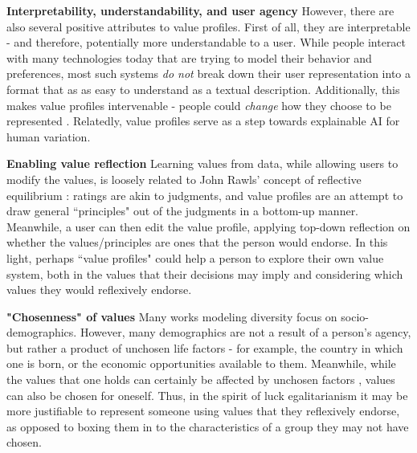 \documentclass[11pt]{article}
\begin{document}
\textbf{Interpretability, understandability, and user agency}
However, there are also several positive attributes to value profiles. First of all, they are interpretable - and therefore, potentially more understandable to a user. While people interact with many technologies today that are trying to model their behavior and preferences, most such systems \textit{do not} break down their user representation into a format that as as easy to understand as a textual description.
Additionally, this makes value profiles intervenable - people could \textit{change} how they choose to be represented \cite{Radlinski2019,lazar2024moralcaseusinglanguage}.
Relatedly, value profiles serve as a step towards explainable AI \citep{arrieta2019explainableartificialintelligencexai, koh2020conceptbottleneckmodels} for human variation.

\textbf{Enabling value reflection}
Learning values from data, while allowing users to modify the values, is loosely related to John Rawls' concept of reflective equilibrium \citep{rawls2005political, sep-reflective-equilibrium}: ratings are akin to judgments, and value profiles are an attempt to draw general ``principles" out of the judgments in a bottom-up manner. Meanwhile, a user can then edit the value profile, applying top-down reflection on whether the values/principles are ones that the person would endorse.
In this light, perhaps ``value profiles" could help a person to explore their own value system, both in the values that their decisions may imply and considering which values they would reflexively endorse.

\textbf{"Chosenness" of values}
Many works modeling diversity focus on socio-demographics. However, many demographics are not a result of a person's agency, but rather a product of unchosen life factors - for example, the country in which one is born, or the economic opportunities available to them. Meanwhile, while the values that one holds can certainly be affected by unchosen factors \citep{Nguyen2024-NGUVCH}, values can also be chosen for oneself.
Thus, in the spirit of luck egalitarianism \citep{Dworkin2002-DWOSVT} it may be more justifiable to represent someone using values that they reflexively endorse, as opposed to boxing them in to the characteristics of a group they may not have chosen.
\end{document}
